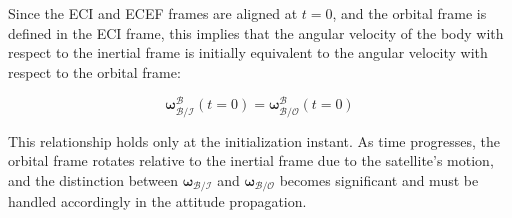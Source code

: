 Since the ECI and ECEF frames are aligned at \( t = 0 \), and the orbital frame is defined in the ECI frame, this implies that the angular velocity of the body with respect to the inertial frame is initially equivalent to the angular velocity with respect to the orbital frame:

\begin{equation}
    \boldsymbol{\omega}_{\mathcal{B/I}}^{\mathcal{B}}(t = 0) = \boldsymbol{\omega}_{\mathcal{B/O}}^{\mathcal{B}}(t = 0)
\end{equation}

This relationship holds only at the initialization instant. As time progresses, the orbital frame rotates relative to the inertial frame due to the satellite's motion, and the distinction between \( \boldsymbol{\omega}_{\mathcal{B/I}} \) and \( \boldsymbol{\omega}_{\mathcal{B/O}} \) becomes significant and must be handled accordingly in the attitude propagation.
